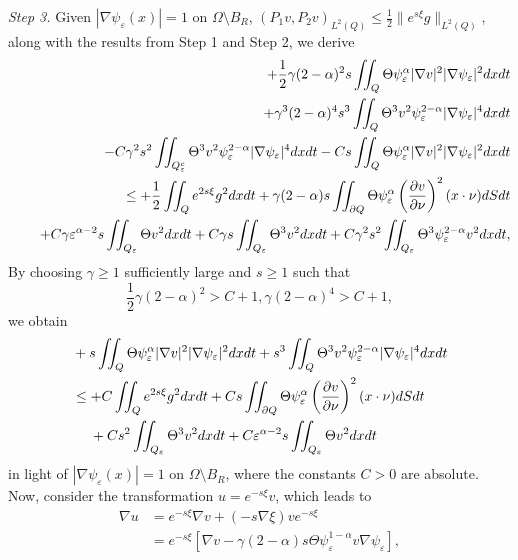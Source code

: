 \documentclass[11pt]{article}
\numberwithin{equation}{section}
\begin{document}
 {\it Step 3.} Given $|\nabla\psi_\varepsilon(x)|=1$ on $\Omega\setminus B_R$, $(P_1v,P_2v)_{L^2(Q)}\leq \frac{1}{2}\|e^{s\xi}g\|_{L^2(Q)}$, along with the results from Step 1 and Step 2, we derive
\begin{eqnarray*}
&&+\frac{1}{2}\gamma(2-\alpha)^2s\iint_Q \Theta \psi_\varepsilon^\alpha |\nabla v|^2|\nabla \psi_\varepsilon|^2dxdt\\
&&+\gamma^3(2-\alpha)^4s^3\iint_{Q}\Theta^3v^2\psi_\varepsilon^{2-\alpha}|\nabla\psi_\varepsilon|^4dxdt\\
&&-C\gamma^2s^2\iint_{Q_\varepsilon^c}\Theta ^3v^2\psi_\varepsilon^{2-\alpha}|\nabla\psi_\varepsilon|^4dxdt-Cs\iint_Q\Theta \psi_\varepsilon^\alpha |\nabla v|^2|\nabla \psi_\varepsilon|^2dxdt\\
&&\leq +\frac{1}{2}\iint_Q e^{2s\xi}g^2dxdt+\gamma(2-\alpha)s\iint_{\partial Q}\Theta \psi_\varepsilon^\alpha \left(\frac{\partial v}{\partial \nu}\right)^2(x\cdot \nu)dSdt\\
&&\hspace{4.5mm}+C\gamma \varepsilon^{\alpha-2}s\iint_{Q_\varepsilon}\Theta v^2dxdt+C\gamma s\iint_{Q_\varepsilon} \Theta^3v^2dxdt+C\gamma^2s^2\iint_{Q_\varepsilon}\Theta^3 \psi_\varepsilon^{2-\alpha}v^2dxdt,
\end{eqnarray*}
By choosing $\gamma\geq 1$ sufficiently large and $s\geq 1$ such that
\begin{equation*}
\frac{1}{2}\gamma (2-\alpha)^2>C+1,   \gamma (2-\alpha)^4>C+1,
\end{equation*}
we obtain
\begin{equation*}
\begin{split}
&+s\iint_Q \Theta \psi_\varepsilon^\alpha |\nabla v|^2|\nabla \psi_\varepsilon|^2dxdt+s^3\iint_{Q}\Theta^3v^2\psi_\varepsilon^{2-\alpha}|\nabla\psi_\varepsilon|^4dxdt\\
&\leq +C\iint_Q e^{2s\xi}g^2dxdt+C s\iint_{\partial Q}\Theta \psi_\varepsilon^\alpha \left(\frac{\partial v}{\partial \nu}\right)^2(x\cdot \nu)dSdt \\
&\hspace{4.5mm}+Cs^2\iint_{Q_\varepsilon}\Theta^3v^2dxdt+C \varepsilon^{\alpha-2}s\iint_{Q_\varepsilon}\Theta v^2dxdt
\end{split}
\end{equation*}
in light of $|\nabla\psi_\varepsilon(x)|=1$ on $\Omega\setminus B_R$, where the constants $C>0$ are absolute.
Now, consider the transformation $u = e^{-s\xi}v$, which leads to
\begin{equation*}
\begin{split}
\nabla u &= e^{-s\xi}\nabla v + (-s\nabla \xi)ve^{-s\xi} \\
&= e^{-s\xi}\left[\nabla v - \gamma(2-\alpha)s\Theta \psi_\varepsilon^{1-\alpha} v\nabla \psi_\varepsilon\right],
\end{split}
\end{equation*}
\end{document}
